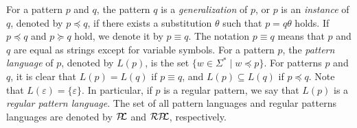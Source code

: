 For a pattern $p$ and $q$,
the pattern $q$ is a \textit{generalization} of $p$, or $p$ is an \textit{instance} of $q$, denoted by $p \preceq q$,
if there exists a substitution $\theta$ such that $p = q\theta$ holds.
If $p \preceq q$ and $p \succeq q$ hold, we denote it by $p \equiv q$.
The notation $p \equiv q$ means that $p$ and $q$ are equal as strings except for variable symbols. 
%
%
For a pattern $p$, the \textit{pattern language} of $p$, denoted by $L(p)$, is the set $\{w \in \Sigma^{\ast} \mid w \preceq p\}$.
For patterns $p$ and $q$, it is clear that $L(p) = L(q)$ if $p \equiv q$, and $L(p) \subseteq L(q)$ if $p \preceq q$.
Note that $L(\varepsilon) = \{\varepsilon\}$.
In particular, if $p$ is a regular pattern, we say that $L(p)$ is a \textit{regular pattern language}.
The set of all pattern languages and regular patterns languages are denoted by $\mathcal{P\!\!L}$ and $\mathcal{RP\!\!L}$, respectively.

